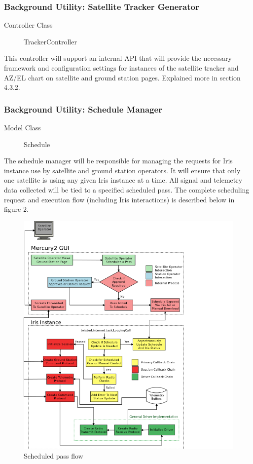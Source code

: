 \documentclass{mxl-note}
\begin{document}
\subsubsection{Background Utility: Satellite Tracker Generator}
\begin{description}
	\item [Controller Class]TrackerController
\end{description}
This controller will support an internal API that will provide the necessary framework and configuration settings for instances of the satellite tracker and AZ/EL chart on satellite and ground station pages. Explained more in section 4.3.2.

\subsubsection{Background Utility: Schedule Manager}
\begin{description}
	\item [Model Class]Schedule
\end{description}
The schedule manager will be responsible for managing the requests for Iris instance use by satellite and ground station operators. It will ensure that only one satellite is using any given Iris instance at a time. All signal and telemetry data collected will be tied to a specified scheduled pass. The complete scheduling request and execution flow (including Iris interactions) is described below in figure 2.
\begin{figure}[hbtp]
\centering
\includegraphics[scale=.65]{Pass_Flow.png}
\caption{Scheduled pass flow}
\end{figure}
\end{document}
